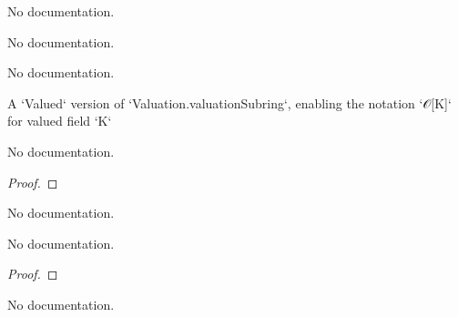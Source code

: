 \begin{definition}
\begin{theorem}\label{Valued.le_one_iff_val_le_one}
                No documentation.
    \end{theorem}

\begin{theorem}\label{Valued.lt_one_iff_val_lt_one}
                No documentation.
    \end{theorem}

\begin{theorem}\label{Valued.zero_le}
                No documentation.
    \end{theorem}

\begin{definition}\label{Valued.valuationSubring}
        \leanok
                A `Valued` version of `Valuation.valuationSubring`, enabling the notation `𝒪[K]` for valued field `K`
    \end{definition}

\begin{theorem}\label{Valued.integer_valuation_eq}
        \leanok
                No documentation.
    \end{theorem}

\begin{proof}
    \leanok
\end{proof}

\begin{theorem}\label{Valued.integerAlgebraMap.monotone}
                No documentation.
    \end{theorem}

\begin{theorem}\label{Valued.integer_val_coe}
        \leanok
                No documentation.
    \end{theorem}

\begin{proof}
    \leanok
\end{proof}

\begin{theorem}\label{Valued.valuationSubring_val_coe}
        \leanok
                No documentation.
    \end{theorem}


\end{definition}
